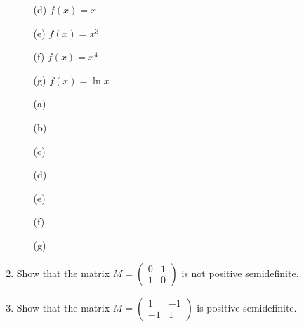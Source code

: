 \documentclass[10pt]{report}
\begin{document}
\begin{enumerate}
\begin{enumerate}
\item[(d)] $f(x) = x$

\item[(e)] $f(x) = x^3$

\item[(f)] $f(x) = x^4$

\item[(g)] $f(x) = \ln x$

\end{enumerate}
\begin{solution}
  \begin{enumerate}
    \item[(a)]
    \item[(b)]
    \item[(c)]
    \item[(d)]
    \item[(e)]
    \item[(f)]
    \item[(g)]
  \end{enumerate}
\end{solution}

\item Show that the matrix $M = \begin{pmatrix} 0 & 1 \\ 1 & 0 \end{pmatrix}$ is not positive semidefinite.
\begin{solution}

\end{solution}

\item Show that the matrix $M = \begin{pmatrix} 1 & -1 \\ -1 & 1 \end{pmatrix}$ is positive semidefinite.
\begin{solution}

\end{solution}


\end{enumerate}
\end{document}
